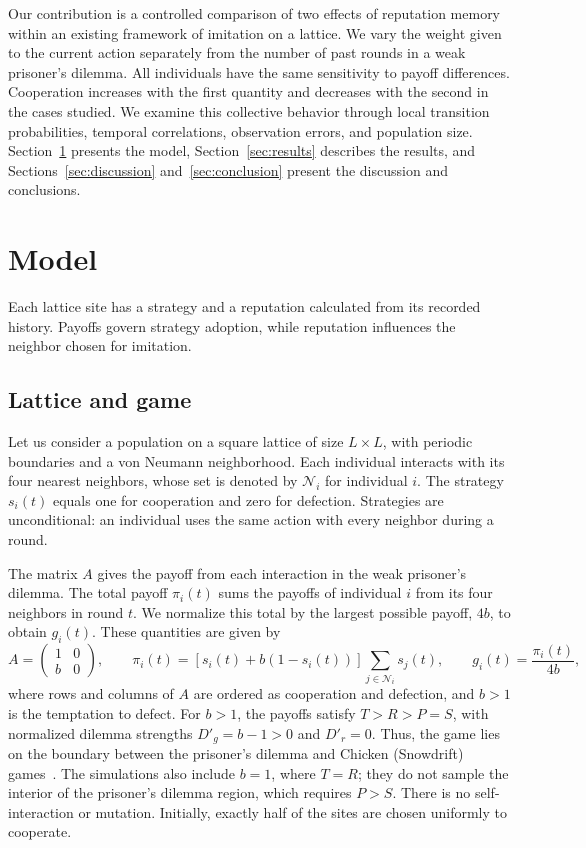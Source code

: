 \documentclass[physics,article,submit,moreauthors]{Definitions/mdpi}
\begin{document}
Our contribution is a controlled comparison of two effects of reputation memory within an existing framework of imitation on a lattice. We vary the weight given to the current action separately from the number of past rounds in a weak prisoner's dilemma. All individuals have the same sensitivity to payoff differences. Cooperation increases with the first quantity and decreases with the second in the cases studied. We examine this collective behavior through local transition probabilities, temporal correlations, observation errors, and population size. Section~\ref{sec:model} presents the model, Section~\ref{sec:results} describes the results, and Sections~\ref{sec:discussion} and~\ref{sec:conclusion} present the discussion and conclusions.

\section{Model}\label{sec:model}
Each lattice site has a strategy and a reputation calculated from its recorded history. Payoffs govern strategy adoption, while reputation influences the neighbor chosen for imitation.

\subsection{Lattice and game}
Let us consider a population on a square lattice of size $L\times L$, with periodic boundaries and a von Neumann neighborhood. Each individual interacts with its four nearest neighbors, whose set is denoted by $\mathcal N_i$ for individual $i$. The strategy $s_i(t)$ equals one for cooperation and zero for defection. Strategies are unconditional: an individual uses the same action with every neighbor during a round.

The matrix $A$ gives the payoff from each interaction in the weak prisoner's dilemma. The total payoff $\pi_i(t)$ sums the payoffs of individual $i$ from its four neighbors in round $t$. We normalize this total by the largest possible payoff, $4b$, to obtain $g_i(t)$. These quantities are given by
\begin{equation}
 A=\begin{pmatrix}1&0\\b&0\end{pmatrix},\qquad
 \pi_i(t)=[s_i(t)+b(1-s_i(t))]\sum_{j\in\mathcal N_i}s_j(t),\qquad
 g_i(t)=\frac{\pi_i(t)}{4b},
 \label{eq:payoff}
\end{equation}
where rows and columns of $A$ are ordered as cooperation and defection, and $b>1$ is the temptation to defect. For $b>1$, the payoffs satisfy $T>R>P=S$, with normalized dilemma strengths $D'_g=b-1>0$ and $D'_r=0$. Thus, the game lies on the boundary between the prisoner's dilemma and Chicken (Snowdrift) games~\cite{tanimoto2007}. The simulations also include $b=1$, where $T=R$; they do not sample the interior of the prisoner's dilemma region, which requires $P>S$. There is no self-interaction or mutation. Initially, exactly half of the sites are chosen uniformly to cooperate.
\end{document}
